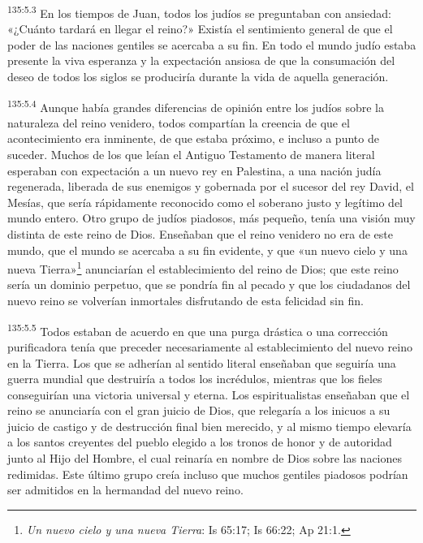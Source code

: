 \par 
\textsuperscript{135:5.3} En los tiempos de Juan, todos los judíos se preguntaban con ansiedad: «¿Cuánto tardará en llegar el reino?» Existía el sentimiento general de que el poder de las naciones gentiles se acercaba a su fin. En todo el mundo judío estaba presente la viva esperanza y la expectación ansiosa de que la consumación del deseo de todos los siglos se produciría durante la vida de aquella generación.

\par 
\textsuperscript{135:5.4} Aunque había grandes diferencias de opinión entre los judíos sobre la naturaleza del reino venidero, todos compartían la creencia de que el acontecimiento era inminente, de que estaba próximo, e incluso a punto de suceder. Muchos de los que leían el Antiguo Testamento de manera literal esperaban con expectación a un nuevo rey en Palestina, a una nación judía regenerada, liberada de sus enemigos y gobernada por el sucesor del rey David, el Mesías, que sería rápidamente reconocido como el soberano justo y legítimo del mundo entero. Otro grupo de judíos piadosos, más pequeño, tenía una visión muy distinta de este reino de Dios. Enseñaban que el reino venidero no era de este mundo, que el mundo se acercaba a su fin evidente, y que «un nuevo cielo y una nueva Tierra»\footnote{\textit{Un nuevo cielo y una nueva Tierra}: Is 65:17; Is 66:22; Ap 21:1.} anunciarían el establecimiento del reino de Dios; que este reino sería un dominio perpetuo, que se pondría fin al pecado y que los ciudadanos del nuevo reino se volverían inmortales disfrutando de esta felicidad sin fin.

\par 
\textsuperscript{135:5.5} Todos estaban de acuerdo en que una purga drástica o una corrección purificadora tenía que preceder necesariamente al establecimiento del nuevo reino en la Tierra. Los que se adherían al sentido literal enseñaban que seguiría una guerra mundial que destruiría a todos los incrédulos, mientras que los fieles conseguirían una victoria universal y eterna. Los espiritualistas enseñaban que el reino se anunciaría con el gran juicio de Dios, que relegaría a los inicuos a su juicio de castigo y de destrucción final bien merecido, y al mismo tiempo elevaría a los santos creyentes del pueblo elegido a los tronos de honor y de autoridad junto al Hijo del Hombre, el cual reinaría en nombre de Dios sobre las naciones redimidas. Este último grupo creía incluso que muchos gentiles piadosos podrían ser admitidos en la hermandad del nuevo reino.

